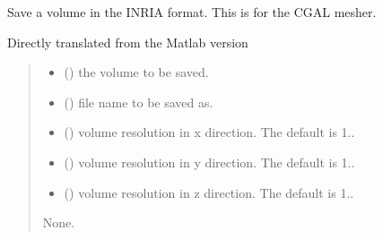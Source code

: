 \documentclass[letterpaper,10pt,english]{sphinxmanual}
\begin{document}
\begin{fulllineitems}
\label{\detokenize{_autosummary/nirfasterff.io.saveinr:nirfasterff.io.saveinr}}
\pysigstartsignatures
\pysiglinewithargsret
{}
{\sphinxparamcomma {}\sphinxparamcomma {}\sphinxparamcomma {}\sphinxparamcomma {}}
{}
\pysigstopsignatures
\sphinxAtStartPar
Save a volume in the INRIA format. This is for the CGAL mesher.

\sphinxAtStartPar
Directly translated from the Matlab version
\begin{quote}\begin{description}
\begin{itemize}
\item {} 
\sphinxAtStartPar
{} () \textendash{} the volume to be saved.

\item {} 
\sphinxAtStartPar
{} () \textendash{} file name to be saved as.

\item {} 
\sphinxAtStartPar
{} (\sphinxstyleliteralemphasis{\sphinxupquote{, }}) \textendash{} volume resolution in x direction. The default is 1..

\item {} 
\sphinxAtStartPar
{} (\sphinxstyleliteralemphasis{\sphinxupquote{, }}) \textendash{} volume resolution in y direction. The default is 1..

\item {} 
\sphinxAtStartPar
{} (\sphinxstyleliteralemphasis{\sphinxupquote{, }}) \textendash{} volume resolution in z direction. The default is 1..

\end{itemize}

\sphinxAtStartPar
None.

\end{description}\end{quote}

\end{fulllineitems}
\end{document}
